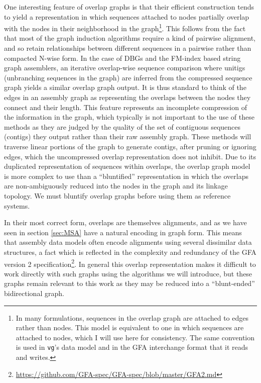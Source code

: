 One interesting feature of overlap graphs is that their efficient construction tends to yield a representation in which sequences attached to nodes partially overlap with the nodes in their neighborhood in the graph\footnote{In many formulations, sequences in the overlap graph are attached to edges rather than nodes. This model is equivalent to one in which sequences are attached to nodes, which I will use here for consistency. The same convention is used in {\tt vg}'s data model and in the GFA interchange format that it reads and writes.}.
This follows from the fact that most of the graph induction algorithms require a kind of pairwise alignment, and so retain relationships between different sequences in a pairwise rather than compacted N-wise form.
In the case of DBGs and the FM-index based string graph assemblers, an iterative overlap-wise sequence comparison where unitigs (unbranching sequences in the graph) are inferred from the compressed sequence graph yields a similar overlap graph output.
It is thus standard to think of the edges in an assembly graph as representing the overlaps between the nodes they connect and their length.
This feature represents an incomplete compression of the information in the graph, which typically is not important to the use of these methods as they are judged by the quality of the set of contiguous sequences (contigs) they output rather than their raw assembly graph.
These methods will traverse linear portions of the graph to generate contigs, after pruning or ignoring edges, which the uncompressed overlap representation does not inhibit.
Due to its duplicated representation of sequences within overlaps, the overlap graph model is more complex to use than a ``bluntified'' representation in which the overlaps are non-ambiguously reduced into the nodes in the graph and its linkage topology.
We must bluntify overlap graphs before using them as reference systems.

In their most correct form, overlaps are themselves alignments, and as we have seen in section \ref{sec:MSA} have a natural encoding in graph form.
This means that assembly data models often encode alignments using several dissimilar data structures, a fact which is reflected in the complexity and redundancy of the GFA version 2 specification\footnote{\url{https://github.com/GFA-spec/GFA-spec/blob/master/GFA2.md}}.
In general this overlap representation makes it difficult to work directly with such graphs using the algorithms we will introduce, but these graphs remain relevant to this work as they may be reduced into a ``blunt-ended'' bidirectional graph.

